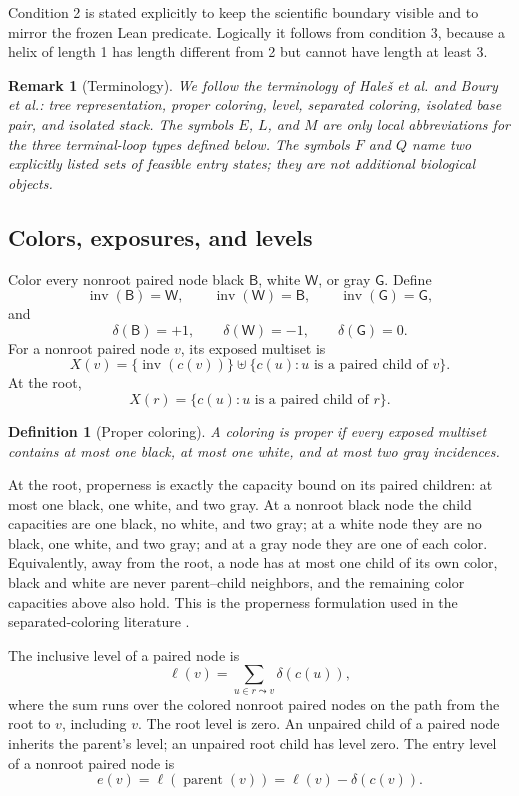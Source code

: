 \documentclass[11pt]{article}
\newtheorem{definition}[theorem]{Definition}
\newtheorem{remark}[theorem]{Remark}
\newcommand{\Bcol}{\mathsf{B}}
\newcommand{\Wcol}{\mathsf{W}}
\newcommand{\Gray}{\mathsf{G}}
\newcommand{\inv}{\operatorname{inv}}
\newcommand{\level}{\ell}
\newcommand{\entry}{e}
\begin{document}
Condition 2 is stated explicitly to keep the scientific boundary visible and to mirror the frozen Lean predicate.  Logically it follows from condition 3, because a helix of length 1 has length different from 2 but cannot have length at least 3.

\begin{remark}[Terminology]
We follow the terminology of Hale\v{s} et al. and Boury et al.: \emph{tree representation}, \emph{proper coloring}, \emph{level}, \emph{separated coloring}, \emph{isolated base pair}, and \emph{isolated stack}.  The symbols $E$, $L$, and $M$ are only local abbreviations for the three terminal-loop types defined below.  The symbols $F$ and $Q$ name two explicitly listed sets of feasible entry states; they are not additional biological objects.
\end{remark}

\subsection{Colors, exposures, and levels}

Color every nonroot paired node black $\Bcol$, white $\Wcol$, or gray $\Gray$.  Define
\[
\inv(\Bcol)=\Wcol,
\qquad \inv(\Wcol)=\Bcol,
\qquad \inv(\Gray)=\Gray,
\]
and
\[
\delta(\Bcol)=+1,
\qquad \delta(\Wcol)=-1,
\qquad \delta(\Gray)=0.
\]
For a nonroot paired node $v$, its exposed multiset is
\[
X(v)=\{\inv(c(v))\}\uplus\{c(u):u\text{ is a paired child of }v\}.
\]
At the root,
\[
X(r)=\{c(u):u\text{ is a paired child of }r\}.
\]

\begin{definition}[Proper coloring]
A coloring is proper if every exposed multiset contains at most one black, at most one white, and at most two gray incidences.
\end{definition}

At the root, properness is exactly the capacity bound on its paired children: at most one black, one white, and two gray.  At a nonroot black node the child capacities are one black, no white, and two gray; at a white node they are no black, one white, and two gray; and at a gray node they are one of each color.  Equivalently, away from the root, a node has at most one child of its own color, black and white are never parent--child neighbors, and the remaining color capacities above also hold.  This is the properness formulation used in the separated-coloring literature \citep{hales2017,boury2024}.

The inclusive level of a paired node is
\[
\level(v)=\sum_{u\in r\leadsto v}\delta(c(u)),
\]
where the sum runs over the colored nonroot paired nodes on the path from the root to $v$, including $v$.  The root level is zero.  An unpaired child of a paired node inherits the parent's level; an unpaired root child has level zero.  The entry level of a nonroot paired node is
\[
\entry(v)=\level(\operatorname{parent}(v))
        =\level(v)-\delta(c(v)).
\]
\end{document}
